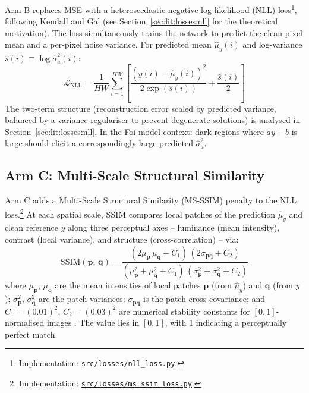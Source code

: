 \documentclass[12pt, a4paper, twoside, openright]{book}
\begin{document}
Arm B replaces MSE with a heteroscedastic negative log-likelihood (NLL) loss\footnote{Implementation: \href{https://github.com/teklesam/ppva_hformer_codebase/blob/main/src/losses/nll_loss.py}{\texttt{src/losses/nll\_loss.py}}.}, following
Kendall and Gal \cite{kendall_what_2017} (see Section~\ref{sec:lit:losses:nll} for the
theoretical motivation). The loss simultaneously trains the network to predict the clean pixel
mean and a per-pixel noise variance. For predicted mean $\hat{\mu}_y(i)$ and
log-variance $\hat{s}(i) \equiv \log\hat{\sigma}^2_a(i)$:
\begin{equation}
\label{eq:methods:nll}
\mathcal{L}_{\mathrm{NLL}} = \frac{1}{HW}\sum_{i=1}^{HW}
  \left[\frac{\left(y(i) - \hat{\mu}_y(i)\right)^2}{2\exp\!\left(\hat{s}(i)\right)}
  + \frac{\hat{s}(i)}{2}\right]
\end{equation}
The two-term structure (reconstruction error scaled by predicted variance, balanced by a
variance regulariser to prevent degenerate solutions) is analysed in
Section~\ref{sec:lit:losses:nll}. In the Foi model context: dark regions where $ay+b$ is
large should elicit a correspondingly large predicted $\hat{\sigma}^2_a$.

\subsection{Arm C: Multi-Scale Structural Similarity}
\label{sec:methods:loss:ssim}

Arm C adds a Multi-Scale Structural Similarity (MS-SSIM) penalty to the NLL loss.\footnote{Implementation: \href{https://github.com/teklesam/ppva_hformer_codebase/blob/main/src/losses/ms_ssim_loss.py}{\texttt{src/losses/ms\_ssim\_loss.py}}.} At each
spatial scale, SSIM \cite{wang_image_2004} compares local patches of the prediction
$\hat{\mu}_y$ and clean reference $y$ along three perceptual axes -- luminance (mean
intensity), contrast (local variance), and structure (cross-correlation) -- via:
\begin{equation}
\label{eq:methods:ssim_loss}
\mathrm{SSIM}(\mathbf{p},\,\mathbf{q})
  = \frac{(2\mu_{\mathbf{p}}\,\mu_{\mathbf{q}} + C_1)\,(2\sigma_{\mathbf{p}\mathbf{q}} + C_2)}
         {(\mu_{\mathbf{p}}^2 + \mu_{\mathbf{q}}^2 + C_1)\,(\sigma_{\mathbf{p}}^2 + \sigma_{\mathbf{q}}^2 + C_2)}
\end{equation}
where $\mu_{\mathbf{p}}$, $\mu_{\mathbf{q}}$ are the mean intensities of local patches
$\mathbf{p}$ (from $\hat{\mu}_y$) and $\mathbf{q}$ (from $y$); $\sigma_{\mathbf{p}}^2$,
$\sigma_{\mathbf{q}}^2$ are the patch variances; $\sigma_{\mathbf{p}\mathbf{q}}$ is the
patch cross-covariance; and $C_1 = (0.01)^2$, $C_2 = (0.03)^2$ are numerical stability
constants for $[0,1]$-normalised images \cite{wang_image_2004}. The value lies in $[0,1]$,
with 1 indicating a perceptually perfect match.
\end{document}
